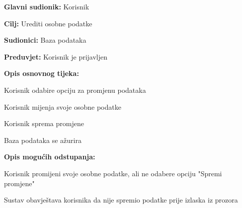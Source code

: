 					\noindent {}
					\begin{packed_item}
	
						\item \textbf{Glavni sudionik: }Korisnik
						\item  \textbf{Cilj:} Urediti osobne podatke
						\item  \textbf{Sudionici:} Baza podataka
						\item  \textbf{Preduvjet:} Korisnik je prijavljen
						\item  \textbf{Opis osnovnog tijeka:}
						
						\item[] \begin{packed_enum}
	
							\item Korisnik odabire opciju za promjenu podataka
							\item Korisnik mijenja svoje osobne podatke
							\item Korisnik sprema promjene
							\item Baza podataka se ažurira

						\end{packed_enum}
						
						\item  \textbf{Opis mogućih odstupanja:}
						
						\item[] \begin{packed_item}
	
							\item[2.a] Korisnik promijeni svoje osobne podatke, ali ne odabere opciju "Spremi promjene"
							\item[] \begin{packed_enum}
								
								\item Sustav obavještava korisnika da nije spremio podatke prije izlaska iz prozora
								
							\end{packed_enum}
							
						\end{packed_item}
					\end{packed_item}
					
